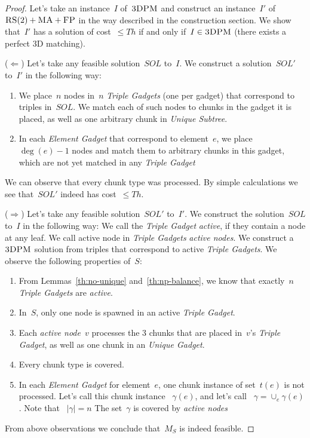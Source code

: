 \documentclass[preprint,12pt]{elsarticle}
\newcommand{\FP}{\textsc{FP}}
\newcommand{\RS}{\textsc{RS}}
\newcommand{\MA}{\textsc{MA}}
\newcommand{\TDPM}{\textsc{3DPM}}
\newcommand{\Unmatched}{\gamma}
\newcommand{\ActiveNode}{\textit{active node}}
\newcommand{\ActiveNodes}{\textit{active nodes}}
\newcommand{\Solution}{S}
\newcommand{\UnqSubtree}{{{\emph{Unique Subtree}}}}
\newcommand{\TripleGadget}{{\emph{Triple Gadget}}}
\newcommand{\TripleGadgets}{{\emph{Triple Gadgets}}}
\newcommand{\UnqGadget}{{\emph{Unique Gadget}}}
\newcommand{\ElGadget}{{\emph{Element Gadget}}}
\newcommand{\Thr}{\ensuremath{Th}}
\newcommand{\Sol}{\ensuremath{SOL}}
\begin{document}
\begin{proof}
  
  Let's take an instance~$I$ of~$\TDPM$ and construct an instance~$I'$
  of~$\RS(2)+\MA+\FP$ in the way described in the construction section.  We show that~$I'$
  has a solution of cost~$\leq \Thr$ if and only if~$I \in \TDPM$ (there
  exists a perfect 3D matching).

  ($\Leftarrow$) Let's take any feasible solution~$\Sol$ to~$I$. We
  construct a solution~$\Sol'$ to~$I'$ in the following way:
  \begin{enumerate}
    \item We place~$n$ nodes in~$n$ {\TripleGadgets} (one per gadget)
    that correspond to triples in~$\Sol$. We match each of such nodes
    to chunks in the gadget it is placed, as well as one arbitrary
    chunk in {\UnqSubtree}.
    \item In each {\ElGadget} that correspond to element~$e$, we place
   ~$\deg(e) - 1$ nodes and match them to arbitrary chunks in this
    gadget, which are not yet matched in any {\TripleGadget}
  \end{enumerate}

  We can observe that every chunk type was processed. By simple
  calculations we see that~$\Sol'$ indeed has cost~$\leq \Thr$.

  ($\Rightarrow$) Let's take any feasible solution~$\Sol'$ to~$I'$.
  We construct the solution~$\Sol$ to~$I$ in the following way:
  We call the {\TripleGadget} \textit{active}, if they contain a node
  at any leaf. We call active node in
  {\TripleGadgets} \ActiveNodes. We construct a~$\TDPM$ solution from
  triples that correspond to active \TripleGadgets.
  We observe the following properties of~$\Solution$:
  \begin{enumerate}
    \item From Lemmas~\ref{th:no-unique} and~\ref{th:np-balance}, we
    know that exactly~$n$ {\TripleGadgets} are \emph{active}.
    \item In~$\Solution$, only one node is spawned in an active
    \TripleGadget.
    \item Each {\ActiveNode}~$v$ processes the 3 chunks that are
    placed in~$v$'s \TripleGadget, as well as one chunk in an \UnqGadget.
    \item Every chunk type is covered.
    \item In each {\ElGadget} for element~$e$, one chunk instance of
    set~$t(e)$ is not processed. Let's call this chunk instance
   ~$\Unmatched(e)$, and let's call
   ~$\Unmatched = \cup_e \Unmatched(e)$. Note that 
   ~$|\Unmatched| = n$
    The set~$\Unmatched$ is covered by \ActiveNodes
  \end{enumerate}

  From above observations we conclude that~$M_S$ is indeed feasible.
\end{proof}
\end{document}
